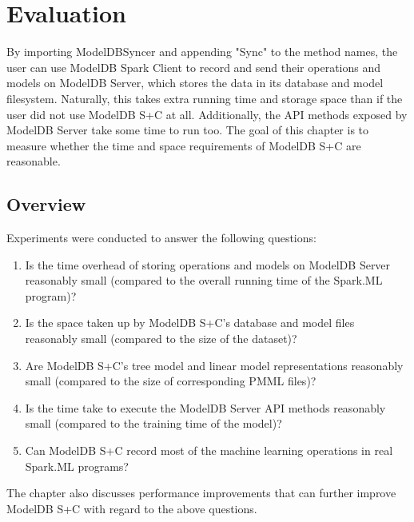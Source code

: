\chapter{Evaluation}
By importing ModelDBSyncer and appending "Sync" to the method names, the user
can use ModelDB Spark Client to record and send their operations and models
on ModelDB Server, which stores the data in its database and model filesystem.
Naturally, this takes extra running time and storage space than if the user did
not use ModelDB S+C at all. Additionally, the API methods exposed by ModelDB Server
take some time to run too. The goal of this chapter is to measure whether the time
and space requirements of ModelDB S+C are reasonable.


\section{Overview}
Experiments were conducted to answer the following questions:

\begin{enumerate}
\item Is the time overhead of storing operations and models on ModelDB Server reasonably small (compared to
the overall running time of the Spark.ML program)?
\item Is the space taken up by ModelDB S+C's database and model files reasonably small (compared
to the size of the dataset)?
\item Are ModelDB S+C's tree model and linear model representations reasonably small (compared 
to the size of corresponding PMML files)?
\item Is the time take to execute the ModelDB Server API methods reasonably small (compared
to the training time of the model)?
\item Can ModelDB S+C record most of the machine learning operations in real Spark.ML programs?
\end{enumerate}

The chapter also discusses performance improvements that can further improve ModelDB S+C with
regard to the above questions.


